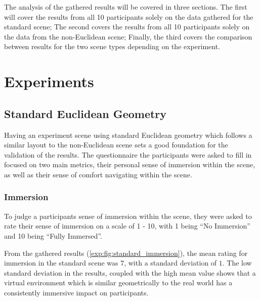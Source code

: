		The analysis of the gathered results will be covered in three sections. The first will cover the results from all 10 participants solely on the data gathered for the standard scene; The second covers the results from all 10 participants solely on the data from the non-Euclidean scene; Finally, the third covers the comparison between results for the two scene types depending on the experiment. %

	\section{Experiments}
	\label{exp:exp}

		\subsection{Standard Euclidean Geometry}
		\label{exp:exp:standard}

			Having an experiment scene using standard Euclidean geometry which follows a similar layout to the non-Euclidean scene sets a good foundation for the validation of the results. %
			The questionnaire the participants were asked to fill in focused on two main metrics, their personal sense of immersion within the scene, as well as their sense of comfort navigating within the scene.

			\subsubsection{Immersion}

				To judge a participants sense of immersion within the scene, they were asked to rate their sense of immersion on a scale of 1 - 10, with 1 being \enquote{No Immersion} and 10 being \enquote{Fully Immersed}.

				From the gathered results (\autoref{exp:fig:standard_immersion}), the mean rating for immersion in the standard scene was $7$, with a standard deviation of $1$.
				The low standard deviation in the results, coupled with the high mean value shows that a virtual environment which is similar geometrically to the real world has a consistently immersive impact on participants.

